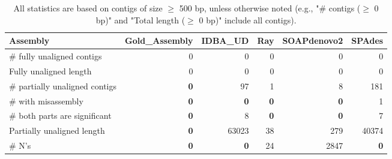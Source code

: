 \documentclass[12pt,a4paper]{article}
\begin{document}
\begin{table}[ht]
\begin{center}
\caption{All statistics are based on contigs of size $\geq$ 500 bp, unless otherwise noted (e.g., "\# contigs ($\geq$ 0 bp)" and "Total length ($\geq$ 0 bp)" include all contigs).}
\begin{tabular}{|l*{5}{|r}|}
\hline
Assembly & Gold\_Assembly & IDBA\_UD & Ray & SOAPdenovo2 & SPAdes \\ \hline
\# fully unaligned contigs & 0 & 0 & 0 & 0 & 0 \\ \hline
Fully unaligned length & 0 & 0 & 0 & 0 & 0 \\ \hline
\# partially unaligned contigs & {\bf 0} & 97 & 1 & 8 & 181 \\ \hline
\hspace{5mm}\# with misassembly & {\bf 0} & {\bf 0} & {\bf 0} & {\bf 0} & 1 \\ \hline
\hspace{5mm}\# both parts are significant & {\bf 0} & 8 & {\bf 0} & {\bf 0} & 7 \\ \hline
Partially unaligned length & {\bf 0} & 63023 & 38 & 279 & 40374 \\ \hline
\# N's & {\bf 0} & {\bf 0} & 24 & 2847 & {\bf 0} \\ \hline
\end{tabular}
\end{center}
\end{table}
\end{document}

